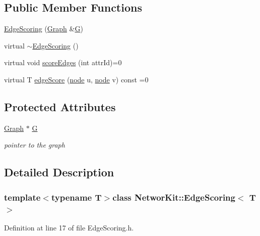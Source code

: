 \subsection*{Public Member Functions}
\begin{DoxyCompactItemize}
\item 
\hyperlink{class_networ_kit_1_1_edge_scoring_a4dc61d79d58927d0354657b4984d6277}{Edge\-Scoring} (\hyperlink{class_networ_kit_1_1_graph}{Graph} \&\hyperlink{class_networ_kit_1_1_edge_scoring_a236d40c30ccbb022125d3dc915865d8a}{G})
\item 
virtual \hyperlink{class_networ_kit_1_1_edge_scoring_ab36424d9d938568d6a478c718cf7c508}{$\sim$\-Edge\-Scoring} ()
\item 
virtual void \hyperlink{class_networ_kit_1_1_edge_scoring_a51bb5124be2834ac097ff8d65f63880d}{score\-Edges} (int attr\-Id)=0
\item 
virtual T \hyperlink{class_networ_kit_1_1_edge_scoring_a4e1bac0c08710b103fad6d944c437d74}{edge\-Score} (\hyperlink{namespace_networ_kit_a53fe3e4fd04ea024160e4d024dfebadf}{node} u, \hyperlink{namespace_networ_kit_a53fe3e4fd04ea024160e4d024dfebadf}{node} v) const =0
\end{DoxyCompactItemize}
\subsection*{Protected Attributes}
\begin{DoxyCompactItemize}
\item 
\hyperlink{class_networ_kit_1_1_graph}{Graph} $\ast$ \hyperlink{class_networ_kit_1_1_edge_scoring_a236d40c30ccbb022125d3dc915865d8a}{G}
\begin{DoxyCompactList}\small\item\em pointer to the graph \end{DoxyCompactList}\end{DoxyCompactItemize}


\subsection{Detailed Description}
\subsubsection*{template$<$typename T$>$class Networ\-Kit\-::\-Edge\-Scoring$<$ T $>$}



Definition at line 17 of file Edge\-Scoring.\-h.



